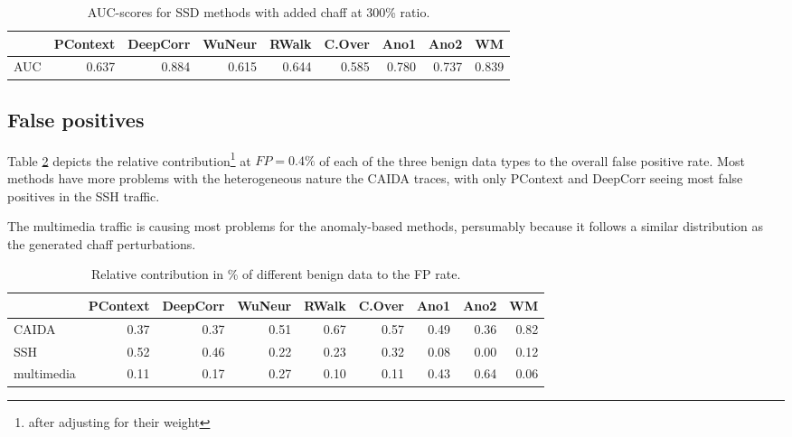 \documentclass[runningheads]{llncs}\usepackage[]{graphicx}\usepackage[]{color}
\begin{document}
\begin{table}
\centering
\begin{tabular}{l|r|r|r|r|r|r|r|r}
  \hline
 & PContext & DeepCorr & WuNeur & RWalk & C.Over & Ano1 & Ano2 & WM \\ 
  \hline
AUC & 0.637 & 0.884 & 0.615 & 0.644 & 0.585 & 0.780 & 0.737 & 0.839 \\ 
   \hline
\end{tabular}

\caption{AUC-scores for SSD methods with added chaff at 300\% ratio.}\label{Tab:AUCchaff}
\end{table}




\subsection{False positives}

Table \ref{Tab:dfFP} depicts the relative contribution\footnote{after adjusting for their weight} at $FP=0.4\%$ of each of the three benign data types to the overall false positive rate. Most methods have more problems with the heterogeneous nature the CAIDA traces, with only PContext and DeepCorr seeing most false positives in the SSH traffic. 

The multimedia traffic is causing most problems for the anomaly-based methods, persumably because it follows a similar distribution as the generated chaff perturbations.
\begin{table}
\centering
\begin{tabular}{l|r|r|r|r|r|r|r|r}
  \hline
 & PContext & DeepCorr & WuNeur & RWalk & C.Over & Ano1 & Ano2 & WM \\ 
  \hline
CAIDA & 0.37 & 0.37 & 0.51 & 0.67 & 0.57 & 0.49 & 0.36 & 0.82 \\ 
  SSH & 0.52 & 0.46 & 0.22 & 0.23 & 0.32 & 0.08 & 0.00 & 0.12 \\ 
  multimedia & 0.11 & 0.17 & 0.27 & 0.10 & 0.11 & 0.43 & 0.64 & 0.06 \\ 
   \hline
\end{tabular}

\caption{Relative contribution in \% of different benign data to the FP rate.}\label{Tab:dfFP}
\end{table}
\end{document}
